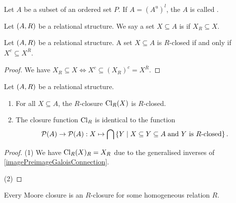 \begin{definition}
Let $A$ be a subset of an ordered set $P$. If $A = (A^u)^l$, the $A$ is called .
\end{definition}

\begin{definition}
Let $\left( A, R \right)$ be a relational structure. We say a set $X\subseteq A$ is  if $X_R \subseteq X$.
\end{definition}

\begin{lemma}
Let $\left( A, R \right)$ be a relational structure. A set $X\subseteq A$ is $R$-closed \textup{if and only if} $X^c \subseteq X^{\overline{R}}$.
\end{lemma}
\begin{proof}
We have $X_R \subseteq X \iff X^c \subseteq (X_R)^c = X^{\overline{R}}$.
\end{proof}

\begin{proposition}
Let $\left( A,R \right)$ be a relational structure.
\begin{enumerate}
\item For all $X\subseteq A$, the $R$-closure $\operatorname{Cl}_R(X)$ is $R$-closed.
\item The closure function $\operatorname{Cl}_R$ is identical to the function
\[ \operatorname{\mathcal{P}}(A) \to \operatorname{\mathcal{P}}(A): X\mapsto \bigcap \left\{ Y \;\middle|\; X \subseteq Y \subseteq A \;\text{and $Y$ is $R$-closed} \right\}. \]
\end{enumerate}
\end{proposition}
\begin{proof}
(1) We have $\operatorname{Cl}_R(X)_R = X_R$ due to the generalised inverses of \ref{imagePreimageGaloisConnection}.

(2) 
\end{proof}
\begin{lemma}
Every Moore closure is an $R$-closure for some homogeneous relation $R$.
\end{lemma}

